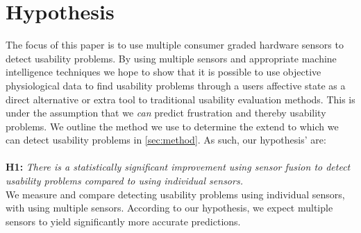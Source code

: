 \section{Hypothesis}
The focus of this paper is to use multiple consumer graded hardware sensors to detect usability problems. 
By using multiple sensors and appropriate machine intelligence techniques we hope to show that it is possible to use objective physiological data to find usability problems through a users affective state as a direct alternative or extra tool to traditional usability evaluation methods. 
This is under the assumption that we \textit{can} predict frustration and thereby usability problems.
We outline the method we use to determine the extend to which we can detect usability problems in \ref{sec:method}.
As such, our hypothesis' are:\\\\

\newcommand{\hypo}[2]{%
  \textbf{H#1:} \textit{#2} \\
}
\hypo{1}{There is a statistically significant improvement using sensor fusion to detect usability problems compared to using individual sensors.}




We measure and compare detecting usability problems using individual sensors, with using multiple sensors. According to
our hypothesis, we expect multiple sensors to yield significantly more accurate predictions.

